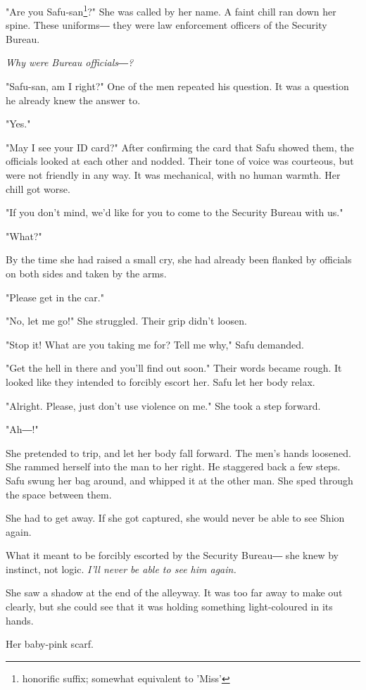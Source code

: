 "Are you Safu-san\footnote{honorific suffix; somewhat equivalent to 'Miss'}?" She was called by her name. A faint chill ran down
her spine. These uniforms― they were law enforcement officers of the
Security Bureau.

\emph{Why were Bureau officials―?}

"Safu-san, am I right?" One of the men repeated his question. It was a
question he already knew the answer to.

"Yes."

"May I see your ID card?" After confirming the card that Safu showed
them, the officials looked at each other and nodded. Their tone of voice
was courteous, but were not friendly in any way. It was mechanical, with
no human warmth. Her chill got worse.

"If you don't mind, we'd like for you to come to the Security Bureau
with us."

"What?"

By the time she had raised a small cry, she had already been flanked by
officials on both sides and taken by the arms.

"Please get in the car."

"No, let me go!" She struggled. Their grip didn't loosen.

"Stop it! What are you taking me for? Tell me why," Safu demanded.

"Get the hell in there and you'll find out soon." Their words became
rough. It looked like they intended to forcibly escort her. Safu let her
body relax.

"Alright. Please, just don't use violence on me." She took a step
forward.

"Ah―!"

She pretended to trip, and let her body fall forward. The men's hands
loosened. She rammed herself into the man to her right. He staggered
back a few steps. Safu swung her bag around, and whipped it at the other
man. She sped through the space between them.

She had to get away. If she got captured, she would never be able to see
Shion again.

What it meant to be forcibly escorted by the Security Bureau― she knew
by instinct, not logic. \emph{I'll never be able to see him again.}

She saw a shadow at the end of the alleyway. It was too far away to make
out clearly, but she could see that it was holding something
light-coloured in its hands.

Her baby-pink scarf.

